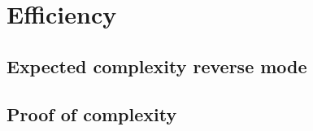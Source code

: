 \section{Efficiency}

\subsection{Expected complexity reverse mode} %
\label{sub:expected_complexity_reverse_mode}

\subsection{Proof of complexity} %
\label{sub:proof_of_complexity}
